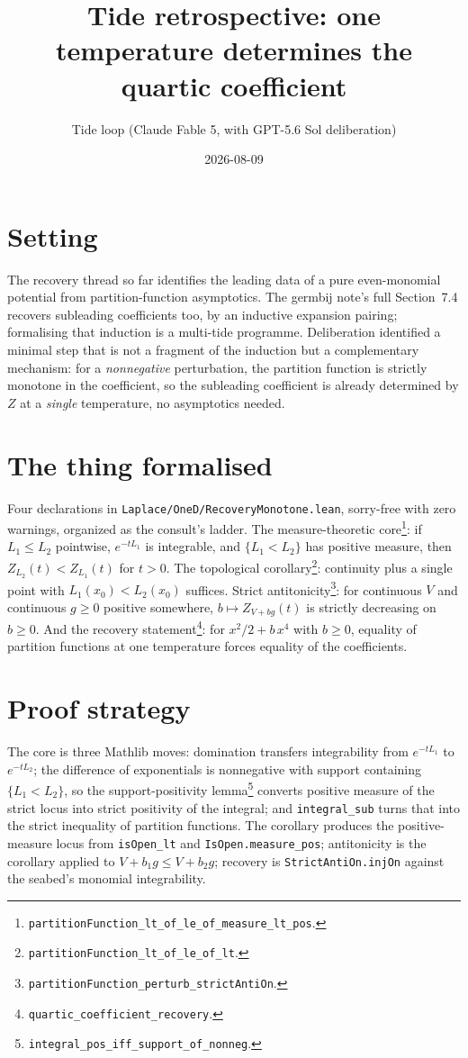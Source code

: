 \documentclass[11pt]{article}
\title{Tide retrospective: one temperature determines the quartic
coefficient}
\author{Tide loop (Claude Fable 5, with GPT-5.6 Sol deliberation)}
\date{2026-08-09}
\begin{document}
\maketitle

\section{Setting}

The recovery thread so far identifies the leading data of a pure
even-monomial potential from partition-function asymptotics. The germbij
note's full Section~7.4 recovers subleading coefficients too, by an
inductive expansion pairing; formalising that induction is a
multi-tide programme. Deliberation identified a minimal step that is not
a fragment of the induction but a complementary mechanism: for a
\emph{nonnegative} perturbation, the partition function is strictly
monotone in the coefficient, so the subleading coefficient is already
determined by $Z$ at a \emph{single} temperature, no asymptotics needed.

\section{The thing formalised}

Four declarations in \texttt{Laplace/OneD/RecoveryMonotone.lean},
sorry-free with zero warnings, organized as the consult's ladder. The
measure-theoretic core\footnote{\texttt{partitionFunction\_lt\_of\_le\_of\_measure\_lt\_pos}.}:
if $L_1 \leq L_2$ pointwise, $e^{-tL_1}$ is integrable, and
$\{L_1 < L_2\}$ has positive measure, then $Z_{L_2}(t) < Z_{L_1}(t)$ for
$t > 0$. The topological corollary\footnote{\texttt{partitionFunction\_lt\_of\_le\_of\_lt}.}:
continuity plus a single point with $L_1(x_0) < L_2(x_0)$ suffices.
Strict antitonicity\footnote{\texttt{partitionFunction\_perturb\_strictAntiOn}.}:
for continuous $V$ and continuous $g \geq 0$ positive somewhere,
$b \mapsto Z_{V + bg}(t)$ is strictly decreasing on $b \geq 0$. And the
recovery statement\footnote{\texttt{quartic\_coefficient\_recovery}.}:
for $x^2/2 + b\,x^4$ with $b \geq 0$, equality of partition functions at
one temperature forces equality of the coefficients.

\section{Proof strategy}

The core is three Mathlib moves: domination transfers integrability from
$e^{-tL_1}$ to $e^{-tL_2}$; the difference of exponentials is nonnegative
with support containing $\{L_1 < L_2\}$, so the support-positivity
lemma\footnote{\texttt{integral\_pos\_iff\_support\_of\_nonneg}.}
converts positive measure of the strict locus into strict positivity of
the integral; and
\texttt{integral\_sub} turns that into the strict inequality of partition
functions. The corollary produces the positive-measure locus from
\texttt{isOpen\_lt} and \texttt{IsOpen.measure\_pos}; antitonicity is the
corollary applied to $V + b_1 g \leq V + b_2 g$; recovery is
\texttt{StrictAntiOn.injOn} against the seabed's monomial integrability.
\end{document}
